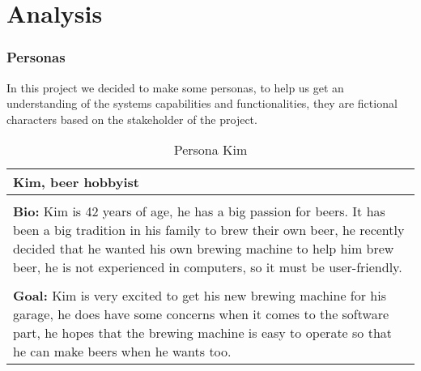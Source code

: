 \section{Analysis}
\subsubsection{Personas}
In this project we decided to make some personas, to help us get an understanding of the systems capabilities and functionalities, they are fictional characters based on the stakeholder of the project. \newline

\begin{table}[htb]
    \begin{center}
        \begin{tabular}{|p{16cm}|}
            \hline
            \textbf{Kim, beer hobbyist}                                                                                                                                                                                                                        \\
            \hline
            \\ \textbf{Bio:} Kim is 42 years of age, he has a big passion for beers. It has been a big tradition in his family to brew their own beer, he recently decided that he wanted his own brewing machine to help him brew beer, he is not experienced in computers, so it must be user-friendly.  \\
            \\
            \textbf{Goal:} Kim is very excited to get his new brewing machine for his garage, he does have some concerns when it comes to the software part, he hopes that the brewing machine is easy to operate so that he can make beers when he wants too. \\
            \hline
        \end{tabular}
        \caption{Persona Kim}
        \label{tab:persona_kim}
    \end{center}
\end{table}

